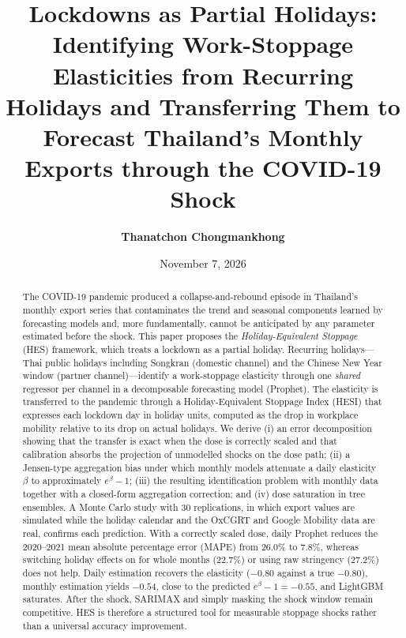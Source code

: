 \documentclass{article}
\title{Lockdowns as Partial Holidays:\\ Identifying Work-Stoppage Elasticities from Recurring Holidays and Transferring Them to Forecast Thailand's Monthly Exports through the COVID-19 Shock}
\author{\textbf{Thanatchon Chongmankhong}}
\date{November 7, 2026}
\theoremstyle{plain}
\theoremstyle{definition}
\theoremstyle{remark}
\begin{document}
\maketitle



\begin{abstract}
\noindent The COVID-19 pandemic produced a collapse-and-rebound episode in Thailand's monthly export series that contaminates the trend and seasonal components learned by forecasting models and, more fundamentally, cannot be anticipated by any parameter estimated before the shock. This paper proposes the \emph{Holiday-Equivalent Stoppage} (HES) framework, which treats a lockdown as a partial holiday. Recurring holidays---Thai public holidays including Songkran (domestic channel) and the Chinese New Year window (partner channel)---identify a work-stoppage elasticity through one \emph{shared} regressor per channel in a decomposable forecasting model (Prophet). The elasticity is transferred to the pandemic through a Holiday-Equivalent Stoppage Index (HESI) that expresses each lockdown day in holiday units, computed as the drop in workplace mobility relative to its drop on actual holidays. We derive (i) an error decomposition showing that the transfer is exact when the dose is correctly scaled and that calibration absorbs the projection of unmodelled shocks on the dose path; (ii) a Jensen-type aggregation bias under which monthly models attenuate a daily elasticity $\beta$ to approximately $e^{\beta}-1$; (iii) the resulting identification problem with monthly data together with a closed-form aggregation correction; and (iv) dose saturation in tree ensembles. A Monte Carlo study with 30 replications, in which export values are simulated while the holiday calendar and the OxCGRT and Google Mobility data are real, confirms each prediction. With a correctly scaled dose, daily Prophet reduces the 2020--2021 mean absolute percentage error (MAPE) from 26.0\% to 7.8\%, whereas switching holiday effects on for whole months (22.7\%) or using raw stringency (27.2\%) does not help. Daily estimation recovers the elasticity ($-0.80$ against a true $-0.80$), monthly estimation yields $-0.54$, close to the predicted $e^{\beta}-1=-0.55$, and LightGBM saturates. After the shock, SARIMAX and simply masking the shock window remain competitive. HES is therefore a structured tool for measurable stoppage shocks rather than a universal accuracy improvement.
\end{abstract}

\end{document}
